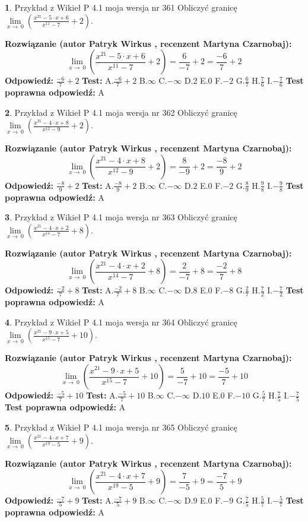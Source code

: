 \documentclass[12pt, a4paper]{article}
\theoremstyle{definition} %
\newtheorem{zad}{}
\newcommand{\zadStart}[1]{\begin{zad}#1\newline}
\newcommand{\zadStop}{\end{zad}}
\newcommand{\rozwStart}[2]{\noindent \textbf{Rozwiązanie (autor #1 , recenzent #2): }\newline}
\newcommand{\rozwStop}{\newline}
\newcommand{\odpStart}{\noindent \textbf{Odpowiedź:}\newline}
\newcommand{\odpStop}{\newline}
\newcommand{\testStart}{\noindent \textbf{Test:}\newline}
\newcommand{\testStop}{\newline}
\newcommand{\kluczStart}{\noindent \textbf{Test poprawna odpowiedź:}\newline}
\newcommand{\kluczStop}{\newline}
\begin{document}
\zadStart{Przykład z Wikieł P 4.1 moja wersja nr 361}
Obliczyć granicę $\lim\limits_{x\to\ 0}(\frac{x^{21}-5 \cdot x +6}{x^{11}-7}+2)$.
\zadStop
\rozwStart{Patryk Wirkus}{Martyna Czarnobaj}
$$\lim\limits_{x\to\ 0}(\frac{x^{21}-5 \cdot x +6}{x^{11}-7}+2)=\frac{6}{-7}+2=\frac{-6}{7}+2$$
\rozwStop
\odpStart
$\frac{-6}{7}+2$
\odpStop
\testStart
A.$\frac{-6}{7}+2$
B.$\infty$
C.$-\infty$
D.$2$
E.$0$
F.$-2$
G.$\frac{6}{7}$
H.$\frac{7}{6}$
I.$-\frac{7}{6}$
\testStop
\kluczStart
A
\kluczStop



\zadStart{Przykład z Wikieł P 4.1 moja wersja nr 362}
Obliczyć granicę $\lim\limits_{x\to\ 0}(\frac{x^{21}-4 \cdot x +8}{x^{12}-9}+2)$.
\zadStop
\rozwStart{Patryk Wirkus}{Martyna Czarnobaj}
$$\lim\limits_{x\to\ 0}(\frac{x^{21}-4 \cdot x +8}{x^{12}-9}+2)=\frac{8}{-9}+2=\frac{-8}{9}+2$$
\rozwStop
\odpStart
$\frac{-8}{9}+2$
\odpStop
\testStart
A.$\frac{-8}{9}+2$
B.$\infty$
C.$-\infty$
D.$2$
E.$0$
F.$-2$
G.$\frac{8}{9}$
H.$\frac{9}{8}$
I.$-\frac{9}{8}$
\testStop
\kluczStart
A
\kluczStop



\zadStart{Przykład z Wikieł P 4.1 moja wersja nr 363}
Obliczyć granicę $\lim\limits_{x\to\ 0}(\frac{x^{21}-4 \cdot x +2}{x^{14}-7}+8)$.
\zadStop
\rozwStart{Patryk Wirkus}{Martyna Czarnobaj}
$$\lim\limits_{x\to\ 0}(\frac{x^{21}-4 \cdot x +2}{x^{14}-7}+8)=\frac{2}{-7}+8=\frac{-2}{7}+8$$
\rozwStop
\odpStart
$\frac{-2}{7}+8$
\odpStop
\testStart
A.$\frac{-2}{7}+8$
B.$\infty$
C.$-\infty$
D.$8$
E.$0$
F.$-8$
G.$\frac{2}{7}$
H.$\frac{7}{2}$
I.$-\frac{7}{2}$
\testStop
\kluczStart
A
\kluczStop



\zadStart{Przykład z Wikieł P 4.1 moja wersja nr 364}
Obliczyć granicę $\lim\limits_{x\to\ 0}(\frac{x^{21}-9 \cdot x +5}{x^{15}-7}+10)$.
\zadStop
\rozwStart{Patryk Wirkus}{Martyna Czarnobaj}
$$\lim\limits_{x\to\ 0}(\frac{x^{21}-9 \cdot x +5}{x^{15}-7}+10)=\frac{5}{-7}+10=\frac{-5}{7}+10$$
\rozwStop
\odpStart
$\frac{-5}{7}+10$
\odpStop
\testStart
A.$\frac{-5}{7}+10$
B.$\infty$
C.$-\infty$
D.$10$
E.$0$
F.$-10$
G.$\frac{5}{7}$
H.$\frac{7}{5}$
I.$-\frac{7}{5}$
\testStop
\kluczStart
A
\kluczStop



\zadStart{Przykład z Wikieł P 4.1 moja wersja nr 365}
Obliczyć granicę $\lim\limits_{x\to\ 0}(\frac{x^{21}-4 \cdot x +7}{x^{19}-5}+9)$.
\zadStop
\rozwStart{Patryk Wirkus}{Martyna Czarnobaj}
$$\lim\limits_{x\to\ 0}(\frac{x^{21}-4 \cdot x +7}{x^{19}-5}+9)=\frac{7}{-5}+9=\frac{-7}{5}+9$$
\rozwStop
\odpStart
$\frac{-7}{5}+9$
\odpStop
\testStart
A.$\frac{-7}{5}+9$
B.$\infty$
C.$-\infty$
D.$9$
E.$0$
F.$-9$
G.$\frac{7}{5}$
H.$\frac{5}{7}$
I.$-\frac{5}{7}$
\testStop
\kluczStart
A
\kluczStop
\end{document}

